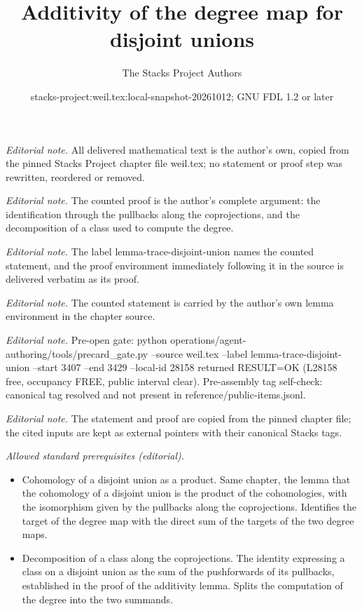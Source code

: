 \documentclass[10pt,a4paper]{amsart}
\title{Additivity of the degree map for disjoint unions}
\author{The Stacks Project Authors}
\date{stacks-project:weil.tex:local-snapshot-20261012; GNU FDL 1.2 or later}
\theoremstyle{plain}
\theoremstyle{definition}
\theoremstyle{remark}
\numberwithin{equation}{subsection}
\begin{document}
\maketitle
\noindent\textit{Editorial note.} All delivered mathematical text is the author's own, copied from the pinned Stacks Project chapter file weil.tex; no statement or proof step was rewritten, reordered or removed.\par\medskip
\noindent\textit{Editorial note.} The counted proof is the author's complete argument: the identification through the pullbacks along the coprojections, and the decomposition of a class used to compute the degree.\par\medskip
\noindent\textit{Editorial note.} The label lemma-trace-disjoint-union names the counted statement, and the proof environment immediately following it in the source is delivered verbatim as its proof.\par\medskip
\noindent\textit{Editorial note.} The counted statement is carried by the author's own lemma environment in the chapter source.\par\medskip
\noindent\textit{Editorial note.} Pre-open gate: python operations/agent-authoring/tools/precard\_gate.py --source weil.tex --label lemma-trace-disjoint-union --start 3407 --end 3429 --local-id 28158 returned RESULT=OK (L28158 free, occupancy FREE, public interval clear). Pre-assembly tag self-check: canonical tag resolved and not present in reference/public-items.jsonl.\par\medskip
\noindent\textit{Editorial note.} The statement and proof are copied from the pinned chapter file; the cited inputs are kept as external pointers with their canonical Stacks tags.\par\medskip
\noindent\textit{Allowed standard prerequisites (editorial).}\begin{itemize}
\item Cohomology of a disjoint union as a product. Same chapter, the lemma that the cohomology of a disjoint union is the product of the cohomologies, with the isomorphism given by the pullbacks along the coprojections. Identifies the target of the degree map with the direct sum of the targets of the two degree maps.
\item Decomposition of a class along the coprojections. The identity expressing a class on a disjoint union as the sum of the pushforwards of its pullbacks, established in the proof of the additivity lemma. Splits the computation of the degree into the two summands.
\end{itemize}\medskip
\end{document}
